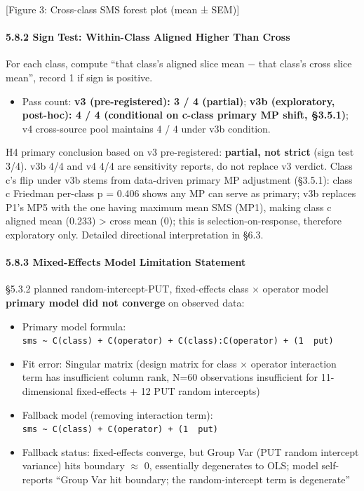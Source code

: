 \documentclass[review,12pt,authoryear]{elsarticle}
\providecommand{\tightlist}{\setlength{\itemsep}{0pt}\setlength{\parskip}{0pt}}
\begin{document}
{[}Figure 3: Cross-class SMS forest plot (mean ± SEM){]}

\paragraph{5.8.2 Sign Test: Within-Class Aligned Higher Than
Cross}\label{sign-test-within-class-aligned-higher-than-cross}

For each class, compute ``that class's aligned slice mean − that class's
cross slice mean'', record 1 if sign is positive.

\begin{itemize}
\tightlist
\item
  Pass count: \textbf{v3 (pre-registered): 3 / 4 (partial)}; \textbf{v3b
  (exploratory, post-hoc): 4 / 4 (conditional on c-class primary MP
  shift, §3.5.1)}; v4 cross-source pool maintains 4 / 4 under v3b
  condition.
\end{itemize}

H4 primary conclusion based on v3 pre-registered: \textbf{partial, not
strict} (sign test 3/4). v3b 4/4 and v4 4/4 are sensitivity reports, do
not replace v3 verdict. Class c's flip under v3b stems from data-driven
primary MP adjustment (§3.5.1): class c Friedman per-class p = 0.406
shows any MP can serve as primary; v3b replaces P1's MP5 with the one
having maximum mean SMS (MP1), making class c aligned mean (0.233)
\textgreater{} cross mean (0); this is selection-on-response, therefore
exploratory only. Detailed directional interpretation in §6.3.

\paragraph{5.8.3 Mixed-Effects Model Limitation
Statement}\label{mixed-effects-model-limitation-statement}

§5.3.2 planned random-intercept-PUT, fixed-effects class $\times$ operator
model \textbf{primary model did not converge} on observed data:

\begin{itemize}
\tightlist
\item
  Primary model formula:
  \texttt{sms\ \textasciitilde{}\ C(class)\ +\ C(operator)\ +\ C(class):C(operator)\ +\ (1\ \textbar{}\ put)}
\item
  Fit error: Singular matrix (design matrix for class $\times$ operator
  interaction term has insufficient column rank, N=60 observations
  insufficient for 11-dimensional fixed-effects + 12 PUT random
  intercepts)
\item
  Fallback model (removing interaction term):
  \texttt{sms\ \textasciitilde{}\ C(class)\ +\ C(operator)\ +\ (1\ \textbar{}\ put)}
\item
  Fallback status: fixed-effects converge, but Group Var (PUT random
  intercept variance) hits boundary $\approx$ 0, essentially degenerates to OLS;
  model self-reports ``Group Var hit boundary; the random-intercept term
  is degenerate''
\end{itemize}
\end{document}
